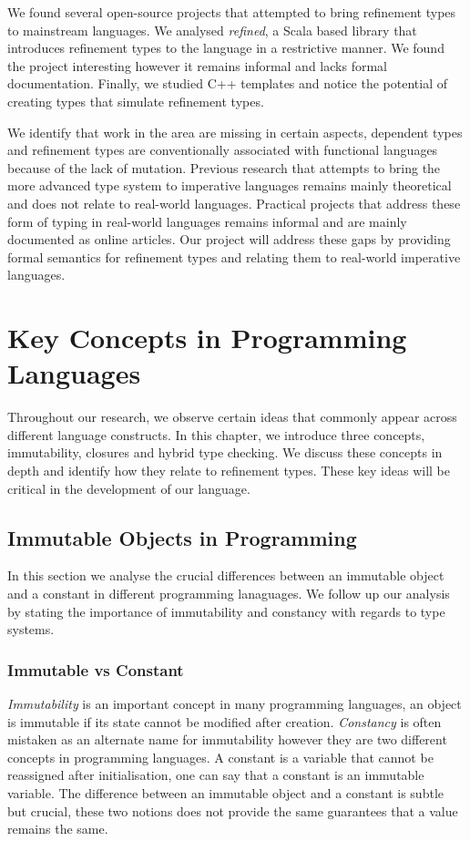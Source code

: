 \documentclass[a4paper,12pt]{report}
\begin{document}
\par
We found several open-source projects that attempted to bring refinement 
types to mainstream languages. We analysed \textit{refined}, a Scala based library that 
introduces refinement types to the language in a restrictive manner. We found the 
project interesting however it remains informal and lacks formal documentation. 
Finally, we studied C++ templates and notice the potential of creating  
types that simulate refinement types.

\par
We identify that work in the area are missing in certain aspects, dependent types 
and refinement types are conventionally associated with functional languages 
because of the lack of mutation. Previous research that attempts to bring the more 
advanced type system to imperative languages remains mainly theoretical and 
does not relate to real-world languages. Practical projects that address 
these form of typing in real-world languages remains informal and are 
mainly documented as online articles. Our project will address these gaps by 
providing formal semantics for refinement types and relating them to 
real-world imperative languages. 

\chapter{Key Concepts in Programming Languages} \label{chapter:key_concepts}
Throughout our research, we observe certain ideas that commonly appear across 
different language constructs. In this chapter, we introduce three concepts, 
immutability, closures and hybrid type checking. We discuss these concepts 
in depth and identify how they relate to refinement types. These key ideas will 
be critical in the development of our language.

\section{Immutable Objects in Programming}
In this section we analyse the crucial differences between an immutable object   
and a constant in different programming lanaguages. We follow up our analysis by 
stating the importance of immutability and constancy with regards to type 
systems.

\subsection{Immutable vs Constant} \label{section:const_immutable}
\emph{Immutability} is an important concept in many programming languages, an 
object is immutable if its state cannot be modified after creation. 
\emph{Constancy} is often mistaken as an alternate name for 
immutability however they are two different concepts in programming languages. 
A constant is a variable that cannot be reassigned after initialisation, one can say 
that a constant is an immutable variable. 
The difference between an immutable object and a constant is subtle but crucial, 
these two notions does not provide the same guarantees that a value remains the 
same.
 
\end{document}
